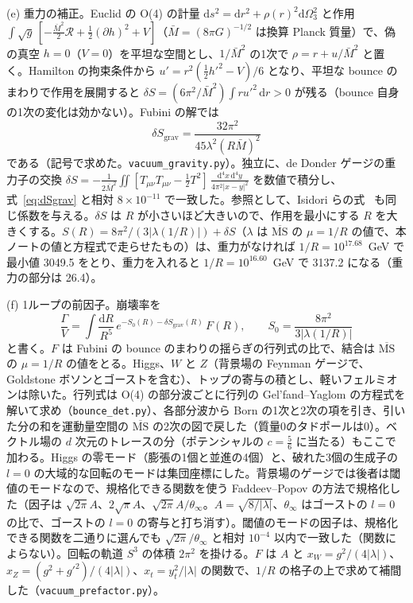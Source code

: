 \documentclass[a4paper,10pt]{ltjsarticle}
\newcommand{\dd}{\mathrm{d}}
\newcommand{\MSbar}{\overline{\mathrm{MS}}}
\begin{document}
(e) 重力の補正。Euclid の O(4) の計量 $\dd s^2=\dd r^2+\rho(r)^2\dd\Omega_3^2$ と作用 $\int\sqrt g\,[-\frac{\bar M^2}2\mathcal R+\frac12(\partial h)^2+V]$（$\bar M=(8\pi G)^{-1/2}$ は換算 Planck 質量）で、偽の真空 $h=0$（$V=0$）を平坦な空間とし、$1/\bar M^2$ の1次で $\rho=r+u/\bar M^2$ と置く。Hamilton の拘束条件から $u'=r^2(\frac12h'^2-V)/6$ となり、平坦な bounce のまわりで作用を展開すると $\delta S=(6\pi^2/\bar M^2)\int ru'^2\,\dd r>0$ が残る（bounce 自身の1次の変化は効かない）。Fubini の解では
\begin{equation}
\delta S_{\mathrm{grav}}=\frac{32\pi^2}{45\lambda^2(R\bar M)^2}
\label{eq:dSgrav}
\end{equation}
である（記号で求めた。\texttt{vacuum\_gravity.py}）。独立に、de Donder ゲージの重力子の交換 $\delta S=-\frac1{2\bar M^2}\iint[T_{\mu\nu}T_{\mu\nu}-\frac12T^2]\,\frac{\dd^4x\,\dd^4y}{4\pi^2|x-y|^2}$ を数値で積分し、式~\eqref{eq:dSgrav} と相対 $8\times10^{-11}$ で一致した。参照として、Isidori らの式~\cite{irst08} も同じ係数を与える。$\delta S$ は $R$ が小さいほど大きいので、作用を最小にする $R$ を大きくする。$S(R)=8\pi^2/(3|\lambda(1/R)|)+\delta S$（$\lambda$ は $\MSbar$ の $\mu=1/R$ の値で、本ノートの値と方程式で走らせたもの）は、重力がなければ $1/R=10^{17.68}$~GeV で最小値 3049.5 をとり、重力を入れると $1/R=10^{16.60}$~GeV で 3137.2 になる（重力の部分は 26.4）。

(f) 1ループの前因子。崩壊率を
\begin{equation}
\frac\Gamma V=\int\frac{\dd R}{R^5}\,e^{-S_0(R)-\delta S_{\mathrm{grav}}(R)}\,F(R),\qquad S_0=\frac{8\pi^2}{3|\lambda(1/R)|}
\label{eq:rate}
\end{equation}
と書く。$F$ は Fubini の bounce のまわりの揺らぎの行列式の比で、結合は $\MSbar$ の $\mu=1/R$ の値をとる。Higgs、$W$ と $Z$（背景場の Feynman ゲージで、Goldstone ボソンとゴーストを含む）、トップの寄与の積とし、軽いフェルミオンは除いた。行列式は O(4) の部分波ごとに行列の Gel'fand--Yaglom の方程式を解いて求め（\texttt{bounce\_det.py}）、各部分波から Born の1次と2次の項を引き、引いた分の和を運動量空間の $\MSbar$ の2次の図で戻した（質量0のタドポールは0）。ベクトル場の $d$ 次元のトレースの分（ポテンシャルの $c=\frac56$ に当たる）もここで加わる。Higgs の零モード（膨張の1個と並進の4個）と、破れた3個の生成子の $l=0$ の大域的な回転のモードは集団座標にした。背景場のゲージでは後者は閾値のモードなので、規格化できる関数を使う Faddeev--Popov の方法で規格化した（因子は $\sqrt{2\pi}A$、$2\sqrt\pi A$、$\sqrt{2\pi}A/\theta_\infty$。$A=\sqrt{8/|\lambda|}$、$\theta_\infty$ はゴーストの $l=0$ の比で、ゴーストの $l=0$ の寄与と打ち消す）。閾値のモードの因子は、規格化できる関数を二通りに選んでも $\sqrt{2\pi}/\theta_\infty$ と相対 $10^{-4}$ 以内で一致した（関数によらない）。回転の軌道 $S^3$ の体積 $2\pi^2$ を掛ける。$F$ は $A$ と $x_W=g^2/(4|\lambda|)$、$x_Z=(g^2+g'^2)/(4|\lambda|)$、$x_t=y_t^2/|\lambda|$ の関数で、$1/R$ の格子の上で求めて補間した（\texttt{vacuum\_prefactor.py}）。
\end{document}
